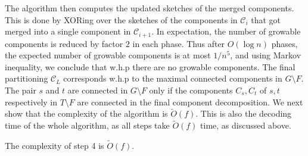 %

The algorithm then computes the updated sketches of the merged components. This is done by XORing over the sketches of the components in $\mathcal{C}_i$ that got merged into a single component in 
$\mathcal{C}_{i+1}$. In expectation, the number of growable components is reduced by factor $2$ in each phase. Thus after $O(\log n)$ phases, the expected number of growable components is at most $1/n^5$, and using Markov inequality, we conclude that w.h.p there are no growable components. The final partitioning $\mathcal{C}_L$ corresponds w.h.p to the maximal connected components in $G \setminus F$. The pair $s$ and $t$ are connected in $G \setminus F$ only if the components $C_s,C_t$ of $s,t$ respectively in $T \setminus F$ are connected in the final component decomposition.
We next show that the complexity of the algorithm is $\widetilde{O}(f)$. This is also the decoding time of the whole algorithm, as all steps take $\widetilde{O}(f)$ time, as discussed above. 

\begin{claim}\label{cl:complexity-step-four}
The complexity of step 4 is $\widetilde{O}(f)$.
\end{claim}

